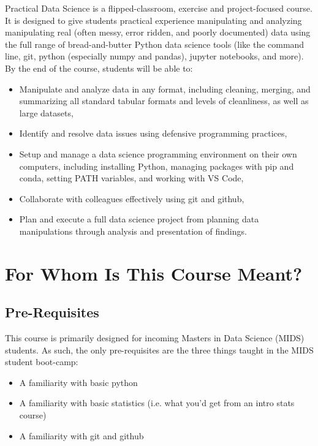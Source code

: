 \documentclass[12pt]{article}
\begin{document}
Practical Data Science is a flipped-classroom, exercise and project-focused course. It is designed to give students practical experience manipulating and analyzing manipulating real (often messy, error ridden, and poorly documented) data using the full range of bread-and-butter Python data science tools (like the command line, git, python (especially numpy and pandas), jupyter notebooks, and more). By the end of the course, students will be able to:

\begin{itemize}
	\item Manipulate and analyze data in any format, including cleaning, merging, and summarizing all standard tabular formats and levels of cleanliness, as well as large datasets,
	\item Identify and resolve data issues using defensive programming practices,
	\item Setup and manage a data science programming environment on their own computers, including installing Python, managing packages with pip and conda, setting PATH variables, and working with VS Code,
	\item Collaborate with colleagues effectively using git and github,
	\item Plan and execute a full data science project from planning data manipulations through analysis and presentation of findings.
\end{itemize}

\section{For Whom Is This Course Meant?}

\subsection{Pre-Requisites}

This course is primarily designed for incoming Masters in Data Science (MIDS) students. As such, the only pre-requisites are the three things taught in the MIDS student boot-camp:

\begin{itemize}
	\item A familiarity with basic python
	\item A familiarity with basic statistics (i.e. what you'd get from an intro stats course)
	\item A familiarity with git and github
\end{itemize}
\end{document}
